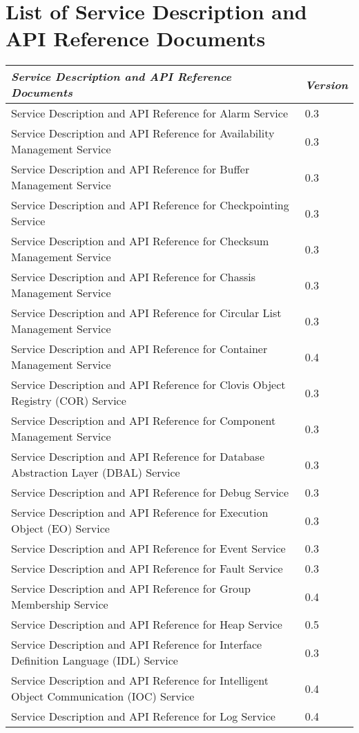 \chapter{List of Service Description and API Reference Documents}
\begin{tabular}{|p{4in}|p{1in}|} \hline
\textbf{\textit{Service Description and API Reference Documents}} &\textbf{\textit{Version}}\\\hline
Service Description and API Reference for Alarm Service &0.3\\
Service Description and API Reference for Availability Management Service &0.3\\
Service Description and API Reference for Buffer Management Service &0.3\\
Service Description and API Reference for Checkpointing Service &0.3\\
Service Description and API Reference for Checksum Management Service &0.3\\
Service Description and API Reference for Chassis Management Service &0.3\\
Service Description and API Reference for Circular List Management Service &0.3\\
Service Description and API Reference for Container Management Service &0.4\\
Service Description and API Reference for Clovis Object Registry (COR) Service &0.3\\
Service Description and API Reference for Component Management Service &0.3\\
Service Description and API Reference for Database Abstraction Layer (DBAL) Service &0.3\\
Service Description and API Reference for Debug Service &0.3\\
Service Description and API Reference for Execution Object (EO) Service &0.3\\
Service Description and API Reference for Event Service &0.3\\
Service Description and API Reference for Fault Service &0.3\\
Service Description and API Reference for Group Membership Service &0.4\\
Service Description and API Reference for Heap Service &0.5\\
Service Description and API Reference for Interface Definition Language (IDL) Service &0.3\\
Service Description and API Reference for Intelligent Object Communication (IOC) Service &0.4\\
Service Description and API Reference for Log Service &0.4\\\hline
\end{tabular}

